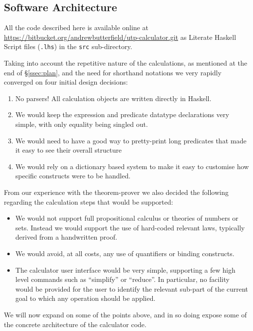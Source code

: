 \subsection{Software Architecture}\label{ssec:architecture}

All the code described here is available online
at
\\\url{https://bitbucket.org/andrewbutterfield/utp-calculator.git}
as Literate Haskell Script files (\texttt{.lhs})
in the \texttt{src} sub-directory.

Taking into account the repetitive nature of the calculations,
as mentioned at the end of \S\ref{ssec:plan},
and the need for shorthand notations we very rapidly converged
on four initial design decisions:
\begin{enumerate}
  \item No parsers! All calculation objects are written
  directly in Haskell.
  \item We would keep the expression and predicate datatype declarations
   very simple, with only equality being singled out.
  \item We would need to have a good way to pretty-print long predicates
    that made it easy to see their overall structure
  \item We would rely on a dictionary based system to
    make it easy to customise how specific constructs
    were to be handled.
\end{enumerate}
From our experience with the  theorem-prover we also decided
the following regarding the calculation steps that would be supported:
\begin{itemize}
  \item
    We would not support full  propositional calculus
    or theories of numbers or sets.
    Instead we would support the use of hard-coded relevant laws,
    typically derived from  a handwritten proof.
  \item
    We would avoid, at all costs,
    any use of quantifiers or binding constructs.
  \item
    The calculator user interface would be very simple,
    supporting a few high level commands such as ``simplify''
    or ``reduce''.
    In particular,
    no facility would be provided for the user to identify
    the relevant sub-part of the current goal to which any operation
    should be applied.
\end{itemize}

We will now expand on some of the points above,
and in so doing expose some of the concrete architecture of the calculator code.
